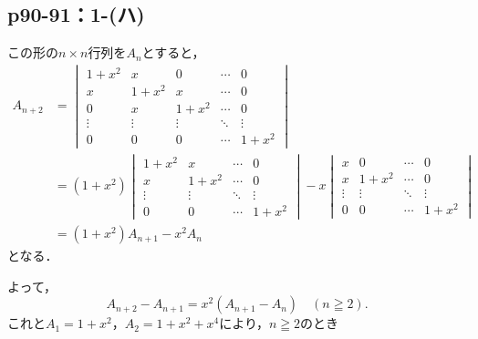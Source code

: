 \documentclass[a4paper,10pt,fleqn]{ltjsarticle}
\begin{document}
\subsection*{p90-91：1-(ハ)}

\begin{tleftbar}
    この形の$n\times n $行列を$A_n$とすると，
    \begin{align*}
        A_{n+2} & =
        \begin{vmatrix}
            1+x^2  & x      & 0      & \cdots & 0      \\
            x      & 1+x^2  & x      & \cdots & 0      \\
            0      & x      & 1+x^2  & \cdots & 0      \\
            \vdots & \vdots & \vdots & \ddots & \vdots \\
            0      & 0      & 0      & \cdots & 1+x^2
        \end{vmatrix} \\
                & = (1+x^2)
        \begin{vmatrix}
            1+x^2  & x      & \cdots & 0      \\
            x      & 1+x^2  & \cdots & 0      \\
            \vdots & \vdots & \ddots & \vdots \\
            0      & 0      & \cdots & 1+x^2
        \end{vmatrix}
        -x \begin{vmatrix}
               x      & 0      & \cdots & 0      \\
               x      & 1+x^2  & \cdots & 0      \\
               \vdots & \vdots & \ddots & \vdots \\
               0      & 0      & \cdots & 1+x^2
           \end{vmatrix}
        \\
                & = (1+x^2) A_{n+1} -x^2 A_n
    \end{align*}
    となる．

    よって，
    \[
        A_{n+2}-A_{n+1}=x^2 (A_{n+1}-A_n)\quad ( n \geqq 2) .
    \]
    これと$ A_1=1+x^2$，$ A_2 = 1+x^2 + x^4$により，$n \geqq 2$のとき


\end{tleftbar}
\end{document}
